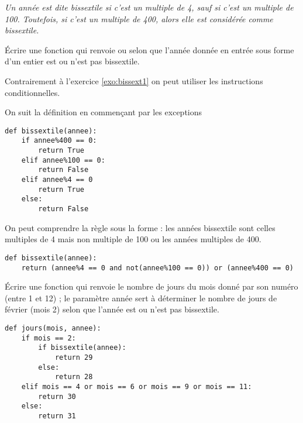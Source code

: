 \bigskip

{\it Un année est dite bissextile si c'est un multiple de 4, sauf si c'est un multiple de 100. Toutefois, si c'est un multiple de 400, alors elle est considérée comme bissextile.}
\begin{Exercise}[title={Année bissextile}]
Écrire une fonction  qui renvoie  ou  selon que l'année donnée en entrée sous forme d'un entier est ou n'est pas bissextile. 

Contrairement à l'exercice \ref{exo:bissext1} on peut utiliser les instructions conditionnelles.
\end{Exercise}
\begin{Answer}
On suit la définition en commençant par les exceptions
\begin{lstlisting}
def bissextile(annee):
    if annee%400 == 0:
        return True
    elif annee%100 == 0:
        return False
    elif annee%4 == 0
        return True
    else:
        return False
\end{lstlisting}

On peut comprendre la règle sous la forme : les années bissextile sont celles multiples de 4 mais non multiple de 100 ou les années multiples de 400. 
\begin{lstlisting}
def bissextile(annee):
    return (annee%4 == 0 and not(annee%100 == 0)) or (annee%400 == 0)
\end{lstlisting}
\end{Answer}
\begin{Exercise}[title={Jours dans le mois}]
Écrire une fonction  qui renvoie le nombre de jours du mois donné par son numéro (entre 1 et 12) ; le paramètre année sert à déterminer le nombre de jours de février (mois 2) selon que l'année est ou n'est pas bissextile.
\end{Exercise}
\begin{Answer}
\begin{lstlisting}
def jours(mois, annee):
    if mois == 2:
        if bissextile(annee):
            return 29
        else:
            return 28
    elif mois == 4 or mois == 6 or mois == 9 or mois == 11:
        return 30
    else:
        return 31
\end{lstlisting}
\end{Answer}
